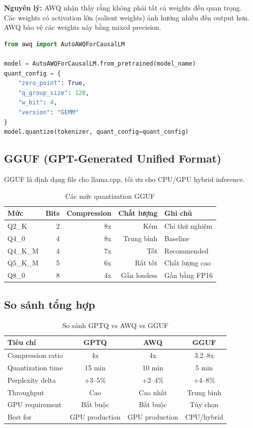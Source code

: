 \documentclass[12pt,a4paper]{report}
\begin{document}
\textbf{Nguyên lý:} AWQ nhận thấy rằng không phải tất cả weights đều quan trọng. Các weights có activation lớn (salient weights) ảnh hưởng nhiều đến output hơn. AWQ bảo vệ các weights này bằng mixed precision.

\begin{lstlisting}[language=Python,caption={AWQ quantization}]
from awq import AutoAWQForCausalLM

model = AutoAWQForCausalLM.from_pretrained(model_name)
quant_config = {
    "zero_point": True,
    "q_group_size": 128,
    "w_bit": 4,
    "version": "GEMM"
}
model.quantize(tokenizer, quant_config=quant_config)
\end{lstlisting}

\subsection{GGUF (GPT-Generated Unified Format)}

GGUF là định dạng file cho llama.cpp, tối ưu cho CPU/GPU hybrid inference.

\begin{table}[h]
\centering
\caption{Các mức quantization GGUF}
\label{tab:gguf-levels}
\begin{tabular}{lrrrl}
\toprule
\textbf{Mức} & \textbf{Bits} & \textbf{Compression} & \textbf{Chất lượng} & \textbf{Ghi chú} \\
\midrule
Q2\_K & 2 & 8x & Kém & Chỉ thử nghiệm \\
Q4\_0 & 4 & 8x & Trung bình & Baseline \\
Q4\_K\_M & 4 & 7x & Tốt & Recommended \\
Q5\_K\_M & 5 & 6x & Rất tốt & Chất lượng cao \\
Q8\_0 & 8 & 4x & Gần lossless & Gần bằng FP16 \\
\bottomrule
\end{tabular}
\end{table}

\subsection{So sánh tổng hợp}

\begin{table}[h]
\centering
\caption{So sánh GPTQ vs AWQ vs GGUF}
\label{tab:quant-comparison}
\begin{tabular}{lccc}
\toprule
\textbf{Tiêu chí} & \textbf{GPTQ} & \textbf{AWQ} & \textbf{GGUF} \\
\midrule
Compression ratio & 4x & 4x & 3.2--8x \\
Quantization time & 15 min & 10 min & 5 min \\
Perplexity delta & +3--5\% & +2--4\% & +4--8\% \\
Throughput & Cao & Cao nhất & Trung bình \\
GPU requirement & Bắt buộc & Bắt buộc & Tùy chọn \\
Best for & GPU production & GPU production & CPU/hybrid \\
\bottomrule
\end{tabular}
\end{table}
\end{document}
